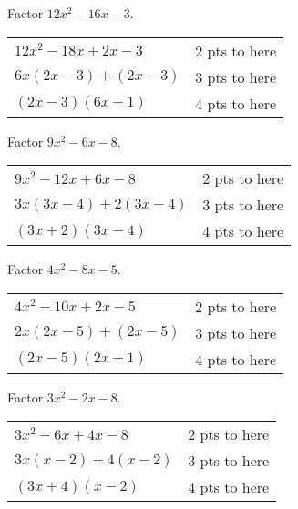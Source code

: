 {
	Factor $12x^2-16x-3$.
}
{
	\begin{tabular}{l r}
	$12x^2-18x+2x-3$ & 2 pts to here\\
	$6x(2x-3)+(2x-3)$ & 3 pts to here\\
	$(2x-3)(6x+1)$ & 4 pts to here
	\end{tabular}
}

{
	Factor $9x^2-6x-8$.
}
{
	\begin{tabular}{l r}
	$9x^2-12x+6x-8$ & 2 pts to here\\
	$3x(3x-4)+2(3x-4)$ & 3 pts to here\\
	$(3x+2)(3x-4)$   & 4 pts to here
	\end{tabular}
}


{
	Factor $4x^2-8x-5$.
}
{
	\begin{tabular}{l r}
	$4x^2-10x+2x-5$  & 2 pts to here \\
	$2x(2x-5)+(2x-5)$	& 3 pts to here \\
	$(2x-5)(2x+1)$ 	  & 4 pts to here 
	\end{tabular}
}

{
	Factor $3x^2-2x-8$.
}
{
	\begin{tabular}{l r}
	$3x^2-6x+4x-8$    & 2 pts to here \\
	$3x(x-2)+4(x-2)$ 	& 3 pts to here \\
	$(3x+4)(x-2)$     & 4 pts to here 
	\end{tabular}
}
